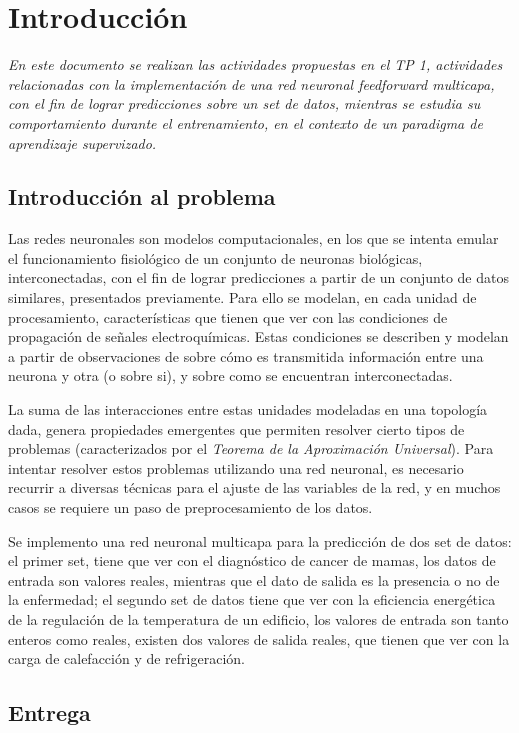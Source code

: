 
\section{Introducción}


\textit{En este documento se realizan las actividades propuestas en el TP 1, actividades relacionadas con la implementación de una red neuronal feedforward multicapa, con el fin de lograr predicciones sobre un set de datos, mientras se estudia su comportamiento durante el entrenamiento, en el contexto de un paradigma de aprendizaje supervizado.}

\subsection{Introducción al problema}
Las redes neuronales son modelos computacionales, en los que se intenta emular el funcionamiento fisiológico de un conjunto de neuronas biológicas, interconectadas, con el fin de lograr predicciones a partir de un conjunto de datos similares, presentados previamente. Para ello se modelan, en cada unidad de procesamiento, características que tienen que ver con las condiciones de propagación de señales electroquímicas. Estas condiciones se describen y modelan a partir de observaciones de sobre cómo es transmitida información entre una neurona y otra (o sobre si), y sobre como se encuentran interconectadas.

La suma de las interacciones entre estas unidades modeladas en una topología dada, genera propiedades emergentes que permiten  resolver cierto tipos de  problemas (caracterizados por el \textit{Teorema de la Aproximación Universal}). 
Para intentar resolver estos problemas utilizando una red neuronal, es necesario recurrir a diversas técnicas para el ajuste de las variables de la red, y en muchos casos se requiere un paso de preprocesamiento de los datos. 

Se implemento una red neuronal multicapa para la predicción de dos set de datos: el primer set, tiene que ver con el diagnóstico de cancer de mamas, los datos de entrada son valores reales, mientras que el dato de salida es la presencia o no de la enfermedad; el segundo set de datos tiene que ver con la eficiencia energética de la regulación de la temperatura de un edificio, los valores de entrada son tanto enteros como reales, existen dos valores de salida reales, que tienen que ver con la carga de calefacción y de refrigeración.  

\subsection{Entrega}

